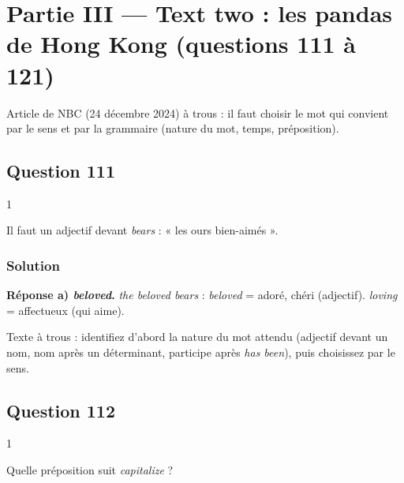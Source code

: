 \documentclass[11pt,a4paper]{article}
\begin{document}
\hypertarget{partie-iii-text-two-les-pandas-de-hong-kong-questions-111-uxe0-121}{%
\section{Partie III --- Text two : les pandas de Hong Kong (questions 111 à 121)}\label{partie-iii-text-two-les-pandas-de-hong-kong-questions-111-uxe0-121}}

Article de NBC (24 décembre 2024) à trous : il faut choisir le mot qui convient par le sens et par la grammaire (nature du mot, temps, préposition).

\hypertarget{question-111}{%
\subsection{Question 111}\label{question-111}}

\begin{indication}{1}

Il faut un adjectif devant \emph{bears} : « les ours bien-aimés ».

\end{indication}

\hypertarget{solution-110}{%
\subsubsection{Solution}\label{solution-110}}

\textbf{Réponse a) \emph{beloved}.} \emph{the beloved bears} : \emph{beloved} = adoré, chéri (adjectif). \emph{loving} = affectueux (qui aime).

\begin{methode}

Texte à trous : identifiez d'abord la nature du mot attendu (adjectif devant un nom, nom après un déterminant, participe après \emph{has been}), puis choisissez par le sens.

\end{methode}

\hypertarget{question-112}{%
\subsection{Question 112}\label{question-112}}

\begin{indication}{1}

Quelle préposition suit \emph{capitalize} ?

\end{indication}
\end{document}
